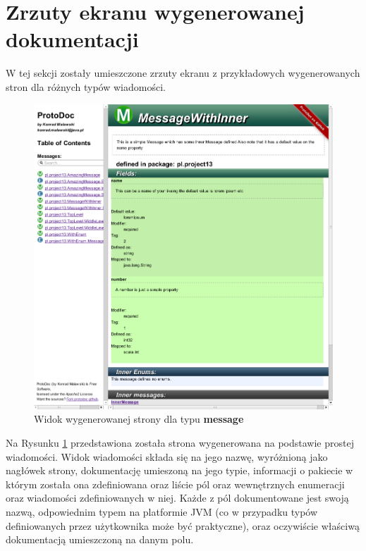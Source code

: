 \documentclass[pdflatex,11pt]{aghdpl}
\begin{document}
\section{Zrzuty ekranu wygenerowanej dokumentacji}
\label{sec:screenshots}
W tej sekcji zostały umieszczone zrzuty ekranu z przykładowych wygenerowanych stron dla różnych typów wiadomości.

\begin{figure}[hc]
 \begin{center}
  \includegraphics[scale=0.5]{../protodoc_main.png}
 \end{center}
 \caption{Widok wygenerowanej strony dla typu \textbf{message}}
 \label{msg_page}
\end{figure}

Na Rysunku \ref{msg_page} przedstawiona została strona wygenerowana na podstawie prostej wiadomości.
Widok wiadomości składa się na jego nazwę, wyróżnioną jako nagłówek strony, dokumentację umieszoną na jego typie,
informacji o pakiecie w którym została ona zdefiniowana oraz liście pól oraz wewnętrznych enumeracji oraz wiadomości zdefiniowanych w niej.
Każde z pól dokumentowane jest swoją nazwą, odpowiednim typem na platformie JVM (co w przypadku typów definiowanych przez użytkownika może być praktyczne),
oraz oczywiście właściwą dokumentacją umieszczoną na danym polu.
\end{document}
